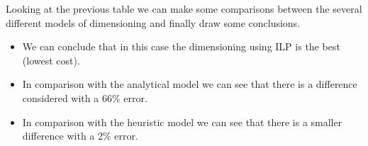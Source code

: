 \vspace{11pt}
Looking at the previous table we can make some comparisons between the several different models of dimensioning and finally draw some conclusions.

\begin{itemize}
  \item We can conclude that in this case the dimensioning using ILP is the best (lowest cost).
  \item In comparison with the analytical model we can see that there is a difference considered with a 66\% error.
  \item In comparison with the heuristic model we can see that there is a smaller difference with a 2\% error.
\end{itemize}

